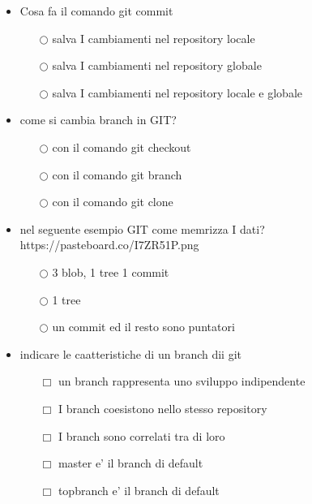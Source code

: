\documentclass[10pt,twocolumn]{article}
\begin{document}
\begin{itemize}
    \item Cosa fa il comando git commit
          \begin{itemize}
              \item[$\bigcirc$] salva I cambiamenti nel repository locale
              \item[$\bigcirc$] salva I cambiamenti nel repository globale
              \item[$\bigcirc$] salva I cambiamenti nel repository locale e globale
          \end{itemize}
\end{itemize}
\begin{itemize}
    \item come si cambia branch in GIT?
          \begin{itemize}
              \item[$\bigcirc$] con il comando git checkout
              \item[$\bigcirc$] con il comando git branch
              \item[$\bigcirc$] con il comando git clone
          \end{itemize}
\end{itemize}
\begin{itemize}
    \item nel seguente esempio GIT come memrizza I dati? https://pasteboard.co/I7ZR51P.png
          \begin{itemize}
              \item[$\bigcirc$] 3 blob, 1 tree 1 commit
              \item[$\bigcirc$] 1 tree
              \item[$\bigcirc$] un commit ed il resto sono puntatori
          \end{itemize}
\end{itemize}
\begin{itemize}
    \item indicare le caatteristiche di un branch dii git
          \begin{itemize}
              \item[$\Box$] un branch rappresenta uno sviluppo indipendente
              \item[$\Box$] I branch coesistono nello stesso repository
              \item[$\Box$] I branch sono correlati tra di loro
              \item[$\Box$] master e' il branch di default
              \item[$\Box$] topbranch e' il branch di default
          \end{itemize}
\end{itemize}
\end{document}
